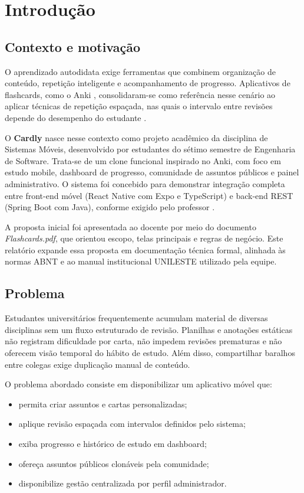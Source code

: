 \chapter{Introdução}

\section{Contexto e motivação}

O aprendizado autodidata exige ferramentas que combinem organização de conteúdo, repetição inteligente e acompanhamento de progresso. Aplicativos de flashcards, como o Anki \cite{anki_manual}, consolidaram-se como referência nesse cenário ao aplicar técnicas de repetição espaçada, nas quais o intervalo entre revisões depende do desempenho do estudante \cite{anki_sm2,medium_spaced_repetition}.

O \textbf{Cardly} nasce nesse contexto como projeto acadêmico da disciplina de Sistemas Móveis, desenvolvido por estudantes do sétimo semestre de Engenharia de Software. Trata-se de um clone funcional inspirado no Anki, com foco em estudo mobile, dashboard de progresso, comunidade de assuntos públicos e painel administrativo. O sistema foi concebido para demonstrar integração completa entre front-end móvel (React Native com Expo e TypeScript) e back-end REST (Spring Boot com Java), conforme exigido pelo professor \cite{react_native_docs,expo_docs,spring_boot_docs}.

A proposta inicial foi apresentada ao docente por meio do documento \textit{Flashcards.pdf}, que orientou escopo, telas principais e regras de negócio. Este relatório expande essa proposta em documentação técnica formal, alinhada às normas ABNT \cite{abnt_nbr14724,abnt_nbr6023} e ao manual institucional UNILESTE utilizado pela equipe.

\section{Problema}

Estudantes universitários frequentemente acumulam material de diversas disciplinas sem um fluxo estruturado de revisão. Planilhas e anotações estáticas não registram dificuldade por carta, não impedem revisões prematuras e não oferecem visão temporal do hábito de estudo. Além disso, compartilhar baralhos entre colegas exige duplicação manual de conteúdo.

O problema abordado consiste em disponibilizar um aplicativo móvel que:
\begin{itemize}
    \item permita criar assuntos e cartas personalizadas;
    \item aplique revisão espaçada com intervalos definidos pelo sistema;
    \item exiba progresso e histórico de estudo em dashboard;
    \item ofereça assuntos públicos clonáveis pela comunidade;
    \item disponibilize gestão centralizada por perfil administrador.
\end{itemize}

